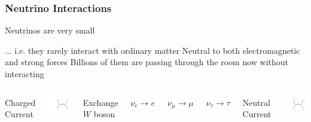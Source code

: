 \documentclass[10pt,professionalfonts,xcolor=table]{beamer}
\begin{document}
\begin{frame}
  \frametitle{Neutrino Interactions}

  \begin{itemize}
  \bang Neutrinos are very small
    \begin{itemize}
    \bing ... i.e. they rarely interact with ordinary matter
    \bing Neutral to both electromagnetic and strong forces
    \bing Billions of them are passing through the room now without interacting
    \end{itemize}
    \end{itemize}
    \gap
    \begin{columns}
  \centering
  \textcolor{custom_red}{Charged Current}

  \includegraphics[height=0.37\textheight, angle=-90]{figures/feynman/ccNumu.pdf}

  \small
  Exchange $W$ boson

  $\nu_e \rightarrow e$

  $\nu_\mu \rightarrow \mu$

  $\nu_\tau \rightarrow \tau$

  \centering
   \textcolor{custom_red}{Neutral Current}


  \includegraphics[height=0.37\textheight, angle=-90]{figures/feynman/ncHad.pdf}


\end{columns}
\end{frame}
\end{document}
